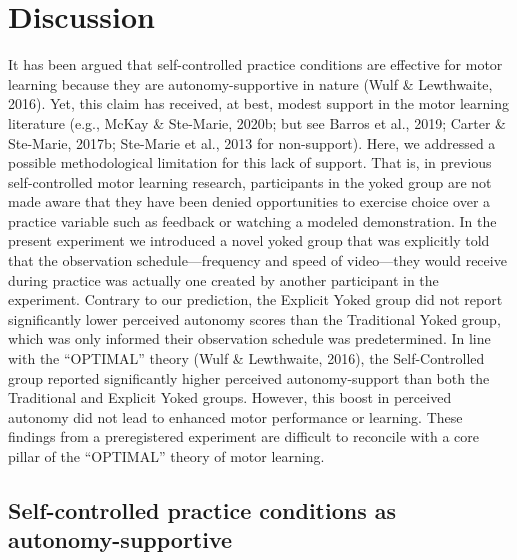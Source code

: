 \documentclass[
  english,
  doc, donotrepeattitle,floatsintext]{apa7}
\begin{document}
\hypertarget{discussion}{%
\section{Discussion}\label{discussion}}

It has been argued that self-controlled practice conditions are effective for motor learning because they are autonomy-supportive in nature (Wulf \& Lewthwaite, 2016). Yet, this claim has received, at best, modest support in the motor learning literature (e.g., McKay \& Ste-Marie, 2020b; but see Barros et al., 2019; Carter \& Ste-Marie, 2017b; Ste-Marie et al., 2013 for non-support). Here, we addressed a possible methodological limitation for this lack of support. That is, in previous self-controlled motor learning research, participants in the yoked group are not made aware that they have been denied opportunities to exercise choice over a practice variable such as feedback or watching a modeled demonstration. In the present experiment we introduced a novel yoked group that was explicitly told that the observation schedule---frequency and speed of video---they would receive during practice was actually one created by another participant in the experiment. Contrary to our prediction, the Explicit Yoked group did not report significantly lower perceived autonomy scores than the Traditional Yoked group, which was only informed their observation schedule was predetermined. In line with the ``OPTIMAL'' theory (Wulf \& Lewthwaite, 2016), the Self-Controlled group reported significantly higher perceived autonomy-support than both the Traditional and Explicit Yoked groups. However, this boost in perceived autonomy did not lead to enhanced motor performance or learning. These findings from a preregistered experiment are difficult to reconcile with a core pillar of the ``OPTIMAL'' theory of motor learning.

\hypertarget{self-controlled-practice-conditions-as-autonomy-supportive}{%
\subsection{Self-controlled practice conditions as autonomy-supportive}\label{self-controlled-practice-conditions-as-autonomy-supportive}}
\end{document}
